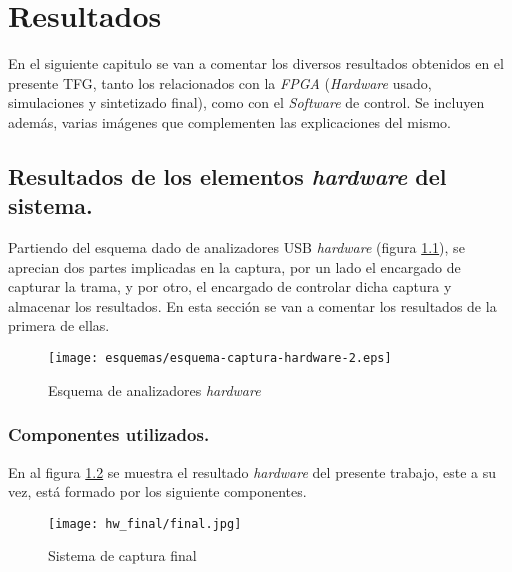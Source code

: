 \chapter{Resultados}
\label{ch:resultados}




En el siguiente capitulo se van a comentar los diversos resultados obtenidos en el presente TFG, tanto los relacionados con la \emph{FPGA} (\emph{Hardware} usado, simulaciones y sintetizado final), como con el \emph{Software} de control. Se incluyen además, varias imágenes que complementen las explicaciones del mismo.

\section{Resultados de los elementos \emph{hardware} del sistema.}
Partiendo del esquema dado de analizadores USB \emph{hardware} (figura \ref{fig:esquema-hardware}), se aprecian dos partes implicadas en la captura, por un lado el encargado de capturar la trama, y por otro, el encargado de controlar dicha captura y almacenar los resultados. En esta sección se van a comentar los resultados de la primera de ellas.

\begin{figure}[htb]
    \centering
    \texttt{[image: esquemas/esquema-captura-hardware-2.eps]}
    \caption{Esquema de analizadores \emph{hardware}}
    \label{fig:esquema-hardware}
\end{figure}

\subsection{Componentes utilizados.}

En al figura \ref{fig:sistema_final} se muestra el resultado \emph{hardware} del presente trabajo, este a su vez, está formado por los siguiente componentes.

\begin{figure}[htbp]
    \centering
    \texttt{[image: hw\_final/final.jpg]}
    \caption{Sistema de captura final}
    \label{fig:sistema_final}
\end{figure}

